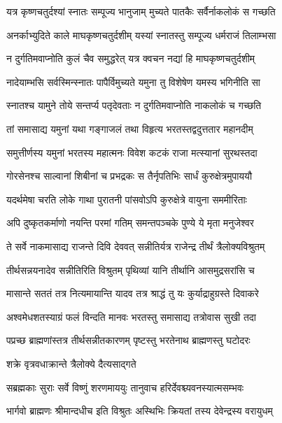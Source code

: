 \twolineshloka
{यत्र कृष्णचतुर्दश्यां स्नातः सम्पूज्य भानुजाम्}
{मुच्यते पातकैः सर्वैर्नाकलोकं स गच्छति}%

\twolineshloka
{अनर्काभ्युदिते काले माघकृष्णचतुर्दशीम्}
{यस्यां स्नातस्तु सम्पूज्य धर्मराजं तिलाम्भसा}%

\twolineshloka
{न दुर्गतिमवाप्नोति कुलं चैव समुद्धरेत्}
{यत्र क्वचन नद्यां हि माघकृष्णचतुर्दशीम्}%

\twolineshloka
{नादेयाम्भसि सर्वस्मिन्स्नातः पापैर्विमुच्यते}
{यमुना तु विशेषेण यमस्य भगिनीति सा}%

\twolineshloka
{स्नातश्च यामुने तोये सन्तर्प्य पतृदेवताः}
{न दुर्गतिमवाप्नोति नाकलोकं च गच्छति} %

\twolineshloka
{तां समासाद्य यमुनां यथा गङ्गाजलं तथा}
{विहृत्य भरतस्तद्वदुत्ततार महानदीम्}%

\twolineshloka
{समुत्तीर्णस्य यमुनां भरतस्य महात्मनः}
{विवेश कटकं राजा मत्स्यानां सुरथस्तदा}%

\twolineshloka
{गोरसेनश्च साल्वानां शिबीनां च प्रभद्रकः}
{स तैर्नृपतिभिः सार्धं कुरुक्षेत्रमुपाययौ}%

\twolineshloka
{यदर्थमेषा चरति लोके गाथा पुरातनी}
{पांसवोऽपि कुरुक्षेत्रे वायुना सममीरिताः}%

\twolineshloka
{अपि दुष्कृतकर्माणो नयन्ति परमां गतिम्}
{समन्तपञ्चके पुण्ये ये मृता मनुजेश्वर}%

\twolineshloka
{ते सर्वे नाकमासाद्य राजन्ते दिवि देववत्}
{सन्नीतिर्यत्र राजेन्द्र तीर्थं त्रैलोक्यविश्रुतम्}%

\twolineshloka
{तीर्थसन्नयनादेव सन्नीतिरिति विश्रुतम्}
{पृथिव्यां यानि तीर्थानि आसमुद्रसरांसि च}%

\twolineshloka
{मासान्ते सततं तत्र नित्यमायान्ति यादव}
{तत्र श्राद्धं तु यः कुर्याद्राहुग्रस्ते दिवाकरे}%

\twolineshloka
{अश्वमेधशतस्याग्रं फलं विन्दति मानवः}
{भरतस्तु समासाद्य तत्रोवास सुखी तदा}%

\twolineshloka
{पप्रच्छ ब्राह्मणांस्तत्र तीर्थसन्नीतकारणम्}
{पृष्टस्तु भरतेनाथ ब्राह्मणस्तु घटोदरः} %


\onelineshloka
{शक्रे वृत्रवधाक्रान्ते त्रैलोक्ये दैत्यसाद्गते}%

\twolineshloka
{सब्रह्मकाः सुराः सर्वे विष्णुं शरणमाययुः}
{तानुवाच हरिर्देवश्च्यवनस्यात्मसम्भवः}%

\twolineshloka
{भार्गवो ब्राह्मणः श्रीमान्दधीच इति विश्रुतः}
{अस्थिभिः क्रियतां तस्य देवेन्द्रस्य वरायुधम्}%

